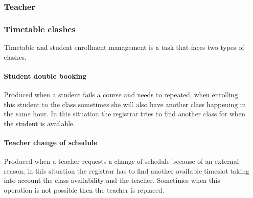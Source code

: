 \subsubsection{Teacher}

\subsubsection{Timetable clashes}
Timetable and student enrollment management is a task that faces two types of clashes.

\paragraph{Student double booking} Produced when a student fails a course and needs to repeated, when enrolling this student to the class sometimes she will also have another class happening in the same hour.
In this situation the registrar tries to find another class for when the student is available.

\paragraph{Teacher change of schedule} Produced when a teacher requests a change of schedule because of an external reason, in this situation the registrar has to find another available timeslot taking into account the class availability and the teacher.
Sometimes when this operation is not possible then the teacher is replaced.
